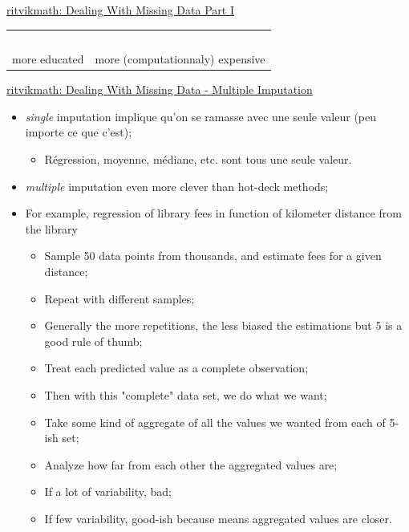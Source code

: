 \documentclass[12pt, titlepage, french]{report}
\begin{document}
\begin{YTB_SUMM_AUTO_NUMB}[label = {rvm-MCAR-etal-deal}]{\href{https://www.youtube.com/watch?v=qIXHLZJJ42U}{ritvikmath: Dealing With Missing Data Part I}}
\begin{itemize}[leftmargin = *]
\begin{center}
\begin{tabular}{| >{\columncolor{beaublue}}c | >{\columncolor{beaublue}}c |}
	\hline\rowcolor{airforceblue} 
		\textcolor{white}{\textbf{Pros}}	&	\textcolor{white}{\textbf{Cons}}	\\
more educated	&	more (computationnaly) expensive	\\\hline
	\end{tabular}
	\end{center}
\end{itemize}
\end{YTB_SUMM_AUTO_NUMB}

\begin{YTB_SUMM_AUTO_NUMB}[label = {rvm-MCAR-etal-mult}]{\href{https://www.youtube.com/watch?v=LMsULWGtP2c}{ritvikmath: Dealing With Missing Data - Multiple Imputation}}
\begin{itemize}[leftmargin = *]
	\item	\textit{single} imputation implique qu'on se ramasse avec une seule valeur (peu importe ce que c'est);
		\begin{itemize}
		\item	Régression, moyenne, médiane, etc. sont tous une seule valeur.
		\end{itemize}
	\item	\textit{multiple} imputation even more clever than hot-deck methods;
	\item	For example, regression of library fees in function of kilometer distance from the library
		\begin{itemize}[leftmargin = *]
		\item	Sample 50 data points from thousands, and estimate fees for a given distance;
		\item	Repeat with different samples;
		\item[]	Generally the more repetitions, the less biased the estimations but 5 is a good rule of thumb;
		\item	Treat each predicted value as a complete observation;
		\item	Then with this "complete" data set, we do what we want;
		\item	Take some kind of aggregate of all the values we wanted from each of 5-ish set;
		\item	Analyze how far from each other the aggregated values are;
		\item[]	If a lot of variability, bad;
		\item[]	If few variability, good-ish because means aggregated values are closer.	
		\end{itemize}
		\begin{center}

\end{center}
\end{itemize}
\end{YTB_SUMM_AUTO_NUMB}
\end{document}
